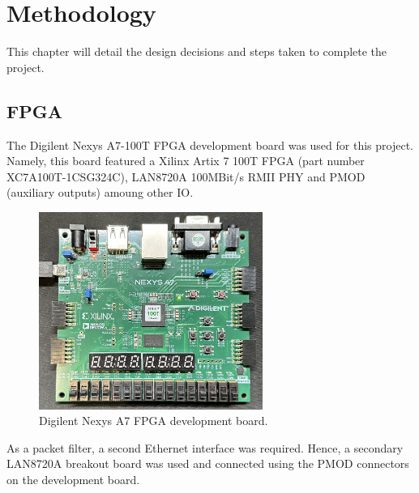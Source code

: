 
\chapter[Methodology]{Methodology}
\label{chap:methodology}	%
\pagestyle{headings}

This chapter will detail the design decisions and steps taken to complete the project. 


\section{FPGA}
The Digilent Nexys A7-100T FPGA development board was used for this project. Namely, this board featured a Xilinx Artix 7 100T FPGA (part number XC7A100T-1CSG324C), LAN8720A 100MBit/s RMII PHY and PMOD (auxiliary outputs) amoung other IO. 


\begin{figure}[h]
    \centering
    \includegraphics[width=0.65\textwidth]{Images/nexysa7_board.jpg}
    \caption[Digilent Nexys A7 FPGA development board]{Digilent Nexys A7 FPGA development board.}
    \label{fig:fpga_dev_board}
\end{figure}


As a packet filter, a second Ethernet interface was required. Hence, a secondary LAN8720A breakout board was used and connected using the PMOD connectors on the development board. 

